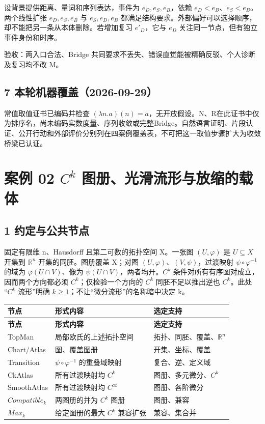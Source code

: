 \documentclass[UTF8,a4paper,zihao=-4,fontset=windows,openany]{ctexbook}
\newcommand{\mcsorigin}[1]{\par\noindent{\small\color{black!55}#1}\par\addvspace{0.8em}}
\def\mathrm#1{#1}%
\begin{document}
设背景提供距离、量词和序列表达，事件为 \(e_D,e_S,e_B\)，依赖 \(e_D<e_B\)、\(e_S<e_B\)。两个线性扩张 \(e_D,e_S,e_B\) 与 \(e_S,e_D,e_B\) 都满足结构要求。外部偏好可以选择顺序，却不能把另一条从本体删除。若增加复习 \(e'_D\)，它与 \(e_D\) 关注同一节点，但有独立事件身份和时序。

验收：两入口合法、Bridge 共同要求不丢失、错误直觉能被精确反驳、个人诊断及复习均不改 M。

\section{7 本轮机器覆盖（2026-09-29）}
常值取值证书已编码并检查 \((\lambda n.a)(n)=a\)，无开放假设。N、R在此证书中仅为排序名，尚未编码实数度量、序列收敛或完整Bridge。自然语言证明、片段认证、公开行动和外部评价分别列在四案例覆盖表，不可把这一取值步骤扩大为收敛桥梁已认证。

\clearpage\chapter{案例 02 \(C^k\) 图册、光滑流形与放缩的载体}
\mcsorigin{原章节：02-Ck与光滑流形.md}
\section{1 约定与公共节点}
固定有限维 n、Hausdorff 且第二可数的拓扑空间 X。一张图 \((U,\varphi)\) 是 \(U\subseteq X\) 开集到 \(\mathbb{R}^n\) 开集的同胚。图册覆盖 X；对图 \((U,\varphi)\)、\((V,\psi)\)，过渡映射 \(\psi\circ\varphi^{-1}\) 的域为 \(\varphi(U\cap V)\)、像为 \(\psi(U\cap V)\)，两者均开。\(C^k\) 条件对所有有序图对成立，因而两个方向都必须 \(C^k\)；仅检验一个方向的 \(C^k\) 同胚不足以推出逆也 \(C^k\)。此处\(“C^k\) 流形”明确 \(k\ge 1\)；不让“微分流形”的名称暗中决定 k。

\begingroup\small\setlength{\tabcolsep}{4pt}
\begin{longtable}{>{\raggedright\arraybackslash}p{}>{\raggedright\arraybackslash}p{}>{\raggedright\arraybackslash}p{}}
\toprule
\textbf{节点} & \textbf{形式内容} & \textbf{选定支持} \\
\midrule
\endfirsthead
\toprule
\textbf{节点} & \textbf{形式内容} & \textbf{选定支持} \\
\midrule
\endhead
\bottomrule
\endfoot
\bottomrule
\endlastfoot
TopMan & 局部欧氏的上述拓扑空间 & 拓扑、同胚、覆盖、\(\mathbb{R}^n\) \\
Chart/Atlas & 图、覆盖图册 & 开集、坐标、覆盖 \\
Transition & \(\psi\circ\varphi^{-1}\) 的重叠域映射 & 复合、逆、定义域 \\
CkAtlas & 所有过渡映射均 \(C^k\) & 图册、多元微分、\(C^k\) \\
SmoothAtlas & 所有过渡映射均 \(C^\infty\) & 图册、各阶微分 \\
\(\mathrm{Compatible}_k\) & 两图册的并为 \(C^k\) 图册 & 图册、兼容 \\
\(\mathrm{Max}_k\) & 给定图册的最大 \(C^k\) 兼容扩张 & 兼容、集合并 \\
\end{longtable}
\endgroup
\end{document}
